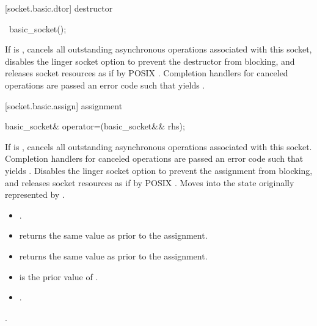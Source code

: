 [socket.basic.dtor]{ destructor}

\begin{itemdecl}
~basic_socket();
\end{itemdecl}

\begin{itemdescr}
\pnum
\effects If  is , cancels all outstanding asynchronous operations associated with this socket, disables the linger socket option to prevent the destructor from blocking, and releases socket resources as if by POSIX . Completion handlers for canceled operations are passed an error code  such that  yields .
\end{itemdescr}



[socket.basic.assign]{ assignment}

\begin{itemdecl}
basic_socket& operator=(basic_socket&& rhs);
\end{itemdecl}

\begin{itemdescr}
\pnum
\effects If  is , cancels all outstanding asynchronous operations associated with this socket. Completion handlers for canceled operations are passed an error code  such that  yields . Disables the linger socket option to prevent the assignment from blocking, and releases socket resources as if by POSIX . Moves into  the state originally represented by .

\pnum
\postconditions
\begin{itemize}
\item
{}.
\item
{} returns the same value as  prior to the assignment.
\item
{} returns the same value as  prior to the assignment.
\item
{} is the prior value of .
\item
{}.
\end{itemize}

\pnum
\returns {}.
\end{itemdescr}


